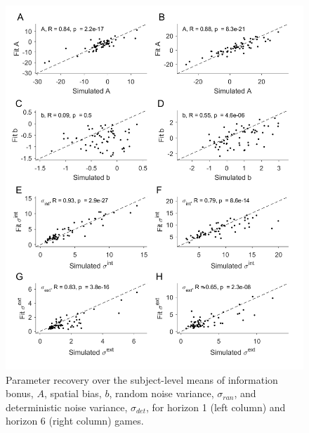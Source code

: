 \documentclass[12pt]{article}
\begin{document}
	
	\begin{figure}[hp]
		\begin{center}
			\includegraphics[width=1\textwidth]{figures/precover.png}
			\caption{Parameter recovery over the subject-level means of information bonus, $A$, spatial bias, $b$, random noise variance, $\sigma_{ran}$, and deterministic noise variance, $\sigma_{det}$, for horizon 1 (left column) and horizon 6 (right column) games. 
			}
			\label{fig:pararecover1}
		\end{center}
	\end{figure} 
	
\end{document}
